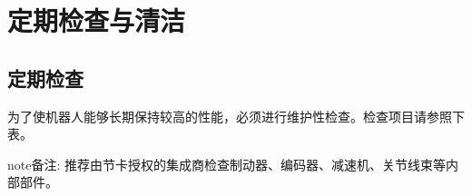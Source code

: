 \documentclass[a4paper,11pt,english,openany,oneside]{sphinxmanual}
\begin{document}
\sphinxstepscope


\chapter{定期检查与清洁}
\label{\detokenize{_u5b9a_u671f_u68c0_u67e5_u4e0e_u6e05_u6d01:id1}}\label{\detokenize{_u5b9a_u671f_u68c0_u67e5_u4e0e_u6e05_u6d01:id2}}\label{\detokenize{_u5b9a_u671f_u68c0_u67e5_u4e0e_u6e05_u6d01::doc}}

\section{定期检查}
\label{\detokenize{_u5b9a_u671f_u68c0_u67e5_u4e0e_u6e05_u6d01:id3}}\label{\detokenize{_u5b9a_u671f_u68c0_u67e5_u4e0e_u6e05_u6d01:id4}}
\sphinxAtStartPar
为了使机器人能够长期保持较高的性能，必须进行维护性检查。检查项目请参照下表。

\begin{sphinxadmonition}{note}{备注:}
\sphinxAtStartPar
推荐由节卡授权的集成商检查制动器、编码器、减速机、关节线束等内部部件。
\end{sphinxadmonition}
\end{document}
